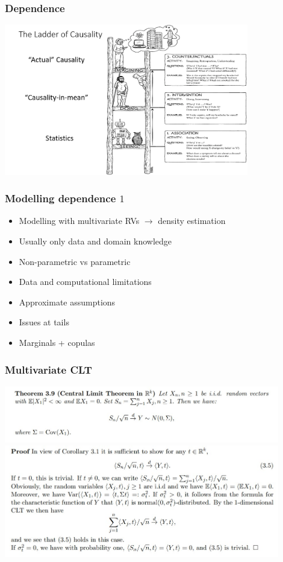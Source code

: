 \documentclass[18pt,aspectratio=149]{beamer}
\begin{document}
\begin{frame}
    \frametitle{Dependence}
    \begin{center}
        \includegraphics[width=0.8\textwidth]{Ladder-1.png}
    \end{center}
\end{frame}

\begin{frame}
    \frametitle{Modelling dependence $1$}
    \begin{itemize}
        \item Modelling with multivariate RVs $\rightarrow$ density estimation
        \item Usually only data and domain knowledge
        \item Non-parametric vs parametric
        \item Data and computational limitations
        \item Approximate assumptions
        \item Issues at tails
        \item Marginals + copulas
    \end{itemize}
\end{frame}



\begin{frame}
    \frametitle{Multivariate CLT}
    \begin{center}
        \includegraphics[width=0.9\textwidth]{CLT.jpg}
        \includegraphics[width=0.9\textwidth]{CLT2.jpg}
    \end{center}
\end{frame}
\end{document}

